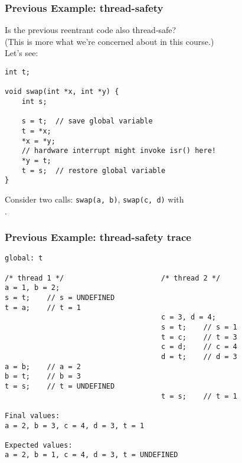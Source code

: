 \begin{frame}[fragile]
  \frametitle{Previous Example: thread-safety}

  
  Is the previous reentrant code also thread-safe?\\

  (This is more what we're concerned about in this course.)\\[1em]

  Let's see:
  \begin{lstlisting}
int t;

void swap(int *x, int *y) {
    int s;
 
    s = t;  // save global variable
    t = *x;
    *x = *y;
    // hardware interrupt might invoke isr() here!
    *y = t;
    t = s;  // restore global variable
}
  \end{lstlisting}
  
  Consider two calls: {\tt swap(a, b)}, {\tt swap(c, d)} with\\
  .
  
\end{frame}

\begin{frame}[fragile]
  \frametitle{Previous Example: thread-safety trace}

  
  \begin{lstlisting}
global: t

/* thread 1 */                       /* thread 2 */
a = 1, b = 2;
s = t;    // s = UNDEFINED
t = a;    // t = 1
                                     c = 3, d = 4;
                                     s = t;    // s = 1
                                     t = c;    // t = 3
                                     c = d;    // c = 4
                                     d = t;    // d = 3
a = b;    // a = 2
b = t;    // b = 3
t = s;    // t = UNDEFINED
                                     t = s;    // t = 1

Final values:
a = 2, b = 3, c = 4, d = 3, t = 1

Expected values:
a = 2, b = 1, c = 4, d = 3, t = UNDEFINED
  \end{lstlisting}
  
\end{frame}

